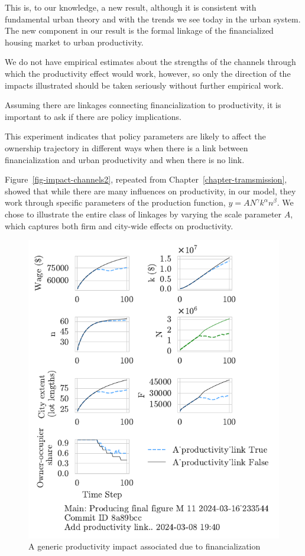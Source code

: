 This is, to our knowledge, a new result, although it is consistent with fundamental urban theory and with the trends we see today in the urban system. The new component in our result is the formal linkage of the financialized housing market to urban productivity.

We do not have empirical estimates about the strengths of the channels through which the productivity effect would work, however, so only the direction of the impacts illustrated should be taken seriously without further empirical work.  

Assuming there are linkages connecting financialization to productivity, it is important to ask if there are policy implications. 

This experiment indicates that policy parameters are likely to affect the ownership trajectory in different ways when there is a link between financialization and urban productivity and when there is no link.

Figure~\ref{fig-impact-channels2}, repeated from Chapter~\ref{chapter-tramsmission}, showed that while there are many influences on productivity, in our model, they work through specific parameters of the production function, $y=AN^\gamma k^\alpha n^\beta$. 
We chose to illustrate the entire class of linkages by varying the scale parameter $A$, which captures both firm and city-wide effects on productivity. 




\begin{figure}[h!tb] 
    \centering
    \includegraphics[scale=1, trim={0 1.4cm .8cm 0},clip]{fig/generic-productivity-impact_233544.pdf} 
    \caption{A generic productivity impact associated due to financialization}
    \label{fig:generic-productivity-impact}
\end{figure}

